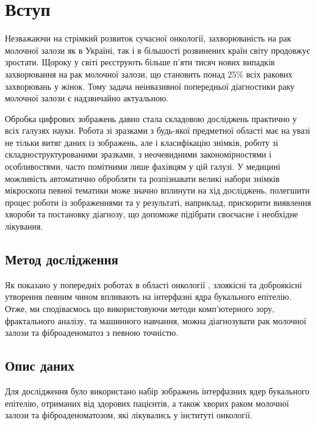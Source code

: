 
\chapter{Вступ} %

\label{Chapter1} %

Незважаючи на стрімкий розвиток сучасної онкології, захворюваність на рак молочної залози як в Україні, так і в більшості розвинених країн світу продовжує зростати. Щороку у світі реєструють більше п’яти тисяч нових випадків захворювання на рак молочної залози, що становить понад 25\% всіх ракових захворювань у жінок. Тому задача неінвазивної попередньої діагностики раку молочної залози є надзвичайно актуальною.

Обробка цифрових зображень давно стала складовою досліджень практично у всіх галузях науки. Робота зі зразками з будь-якої предметної області має на увазі не тільки витяг даних із зображень, але і класифікацію знімків, роботу зі складноструктурованими зразками, з неочевидними закономірностями і особливостями, часто помітними лише фахівцям у цій галузі. У медицині можливість автоматично обробляти та розпізнавати великі набори знімків мікроскопа певної тематики може значно вплинути на хід досліджень, полегшити процес роботи із зображеннями та у результаті, наприклад, прискорити виявлення хвороби та постановку діагнозу, що допоможе підібрати своєчасне і необхідне лікування.


\section{Метод дослідження}

Як показано у попередніх роботах в області онкології \citep{bib:the_beginning}, злоякісні та доброякісні утворення певним чином впливають на інтерфазні ядра букального епітелію. Отже, ми сподіваємось що використовуючи методи комп'ютерного зору, фрактального аналізу, та машинного навчання, можна діагнозувати рак молочної залози та фіброаденоматоз з певною точністю.

\section{Опис даних}

Для дослідження було використано набір зображень інтерфазних ядер букального епітелію, отриманих від здорових пацієнтів, а також хворих раком молочної залози та фіброаденоматозом, які лікувались у інституті онкології. 
